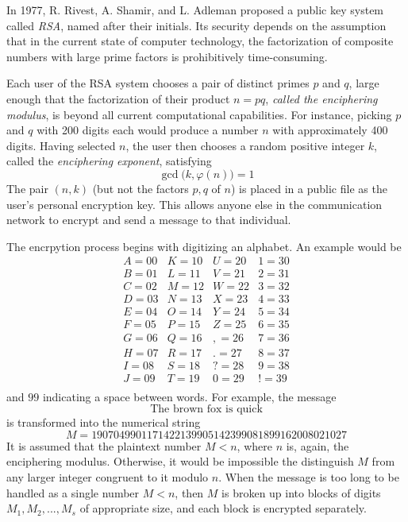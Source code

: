 \documentclass{article}
\theoremstyle{remark}
\theoremstyle{definition}
\begin{document}
In 1977, R. Rivest, A. Shamir, and L. Adleman proposed a public key system called \textit{RSA}, named after their initials. Its security depends on the assumption that in the current state of computer technology, the factorization of composite numbers with large prime factors is prohibitively time-consuming. 

Each user of the RSA system chooses a pair of distinct primes $p$ and $q$, large enough that the factorization of their product $n = pq$, \textit{called the enciphering modulus}, is beyond all current computational capabilities. For instance, picking $p$ and $q$ with 200 digits each would produce a number $n$ with approximately 400 digits. Having selected $n$, the user then chooses a random positive integer $k$, called the \textit{enciphering exponent}, satisfying
\[\gcd\big(k, \varphi(n)\big) = 1\]
The pair $(n, k)$ (but not the factors $p, q$ of $n$) is placed in a public file as the user's personal encryption key. This allows anyone else in the communication network to encrypt and send a message to that individual. 

The encrpytion process begins with digitizing an alphabet. An example would be 
\[\begin{array}{cccc}
    A=00 & K=10 & U=20 & 1 = 30 \\
    B=01 & L=11 & V=21 & 2=31 \\
    C = 02 & M = 12 & W = 22 & 3 = 32 \\
    D = 03 & N = 13 & X = 23 & 4 = 33 \\
    E = 04 & O = 14 & Y = 24 & 5 = 34 \\
    F = 05 & P = 15 & Z = 25 & 6 = 35 \\
    G = 06 & Q = 16 & , = 26 & 7 = 36 \\
    H = 07 & R = 17 & . = 27 & 8 = 37 \\
    I = 08 & S = 18 & ? = 28 & 9 = 38 \\
    J = 09 & T = 19 & 0 = 29 & ! = 39 \\
\end{array}\]
and $99$ indicating a space between words. For example, the message
\[\text{The brown fox is quick}\]
is transformed into the numerical string
\[M = 1907049901171422139905142399081899162008021027\]
It is assumed that the plaintext number $M < n$, where $n$ is, again, the enciphering modulus. Otherwise, it would be impossible the distinguish $M$ from any larger integer congruent to it modulo $n$. When the message is too long to be handled as a single number $M<n$, then $M$ is broken up into blocks of digits $M_1, M_2, ..., M_s$ of appropriate size, and each block is encrypted separately. 
\end{document}
